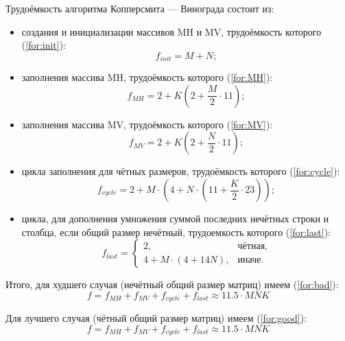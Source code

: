 Трудоёмкость алгоритма Копперсмита — Винограда состоит из:
\begin{itemize}
	\item создания и инициализации массивов MH и MV, трудоёмкость которого (\ref{for:init}):
	\begin{equation}
		\label{for:init}
		f_{init} = M + N;
	\end{equation}
	
	\item заполнения массива MH, трудоёмкость которого (\ref{for:MH}):
	\begin{equation}
		\label{for:MH}
		f_{MH} = 2 + K (2 + \frac{M}{2} \cdot 11);
	\end{equation}
	
	\item заполнения массива MV, трудоёмкость которого (\ref{for:MV}):
	\begin{equation}
		\label{for:MV}
		f_{MV} = 2 + K (2 + \frac{N}{2} \cdot 11);
	\end{equation}
	
	\item цикла заполнения для чётных размеров, трудоёмкость которого (\ref{for:cycle}):
	\begin{equation}
		\label{for:cycle}
		f_{cycle} = 2 + M \cdot (4 + N \cdot (11 + \frac{K}{2} \cdot 23));
	\end{equation}
	
	\item цикла, для дополнения умножения суммой последних нечётных строки и столбца, если общий размер нечётный, трудоемкость которого (\ref{for:last}):
	\begin{equation}
		\label{for:last}
		f_{last} = \begin{cases}
			2, & \text{чётная,}\\
			4 + M \cdot (4 + 14N), & \text{иначе.}
		\end{cases}
	\end{equation}
\end{itemize}

Итого, для худшего случая (нечётный общий размер матриц) имеем (\ref{for:bad}):
\begin{equation}
	\label{for:bad}
	f =  f_{MH} + f_{MV} + f_{cycle} + f_{last}\approx 11.5 \cdot MNK
\end{equation}

Для лучшего случая (чётный общий размер матриц) имеем (\ref{for:good}):
\begin{equation}
	\label{for:good}
	f =  f_{MH} + f_{MV} + f_{cycle} + f_{last} \approx 11.5 \cdot MNK
\end{equation}



